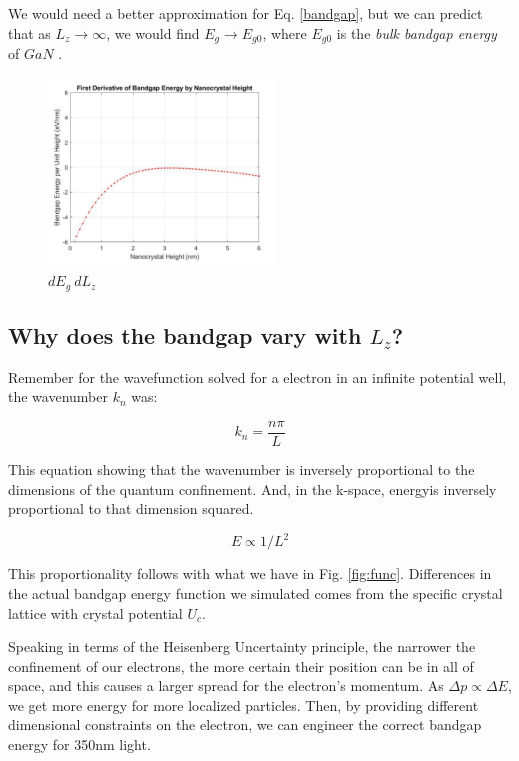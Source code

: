 \documentclass{IEEEtran}
\begin{document}
We would need a better approximation for Eq. \ref{bandgap}, but we can predict that as \(L_z \to \infty\), we would find \(E_g \to E_{g0}\), where \(E_{g0}\) is the \textit{bulk bandgap energy} of \(GaN\) .



\begin{figure}[!h] 
    \centering
    \includegraphics*[width = 6cm]{derivativeOfEgVLz.png}
    \caption{\(dE_g \ dL_z\)}
    \label{fig:derivative}
\end{figure}    

\subsection{Why does the bandgap vary with \( L_z \)?}

Remember for the wavefunction solved for a electron in an infinite potential well, the wavenumber \(k_n\) was:

\begin{equation}
    k_n = \frac{n \pi}{L}
\end{equation}

This equation showing that the wavenumber is inversely proportional to the dimensions of the quantum confinement. And, in the k-space, energyis inversely proportional to that dimension squared.

\begin{equation}
    E \propto 1/L^2
\end{equation}

This proportionality follows with what we have in Fig. \ref{fig:func}. Differences in the actual bandgap energy function we simulated comes from the specific crystal lattice with crystal potential \(U_c\).

Speaking in terms of the Heisenberg Uncertainty principle, the narrower the confinement of our electrons, the more certain their position can be in all of space, and this causes a larger spread for the electron's momentum. As \(\Delta p \propto \Delta E\), we get more energy for more localized particles. Then, by providing different dimensional constraints on the electron, we can engineer the correct bandgap energy for 350nm light.
\end{document}
